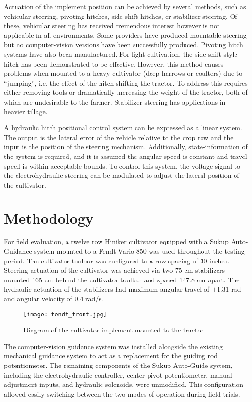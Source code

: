 Actuation of the implement position can be achieved by several
methods, such as vehicular steering, pivoting hitches, side-shift
hitches, or stabilizer steering. Of these, vehicular steering has
received tremendous interest however is not applicable in all
environments. Some providers have produced mountable steering but no
computer-vision versions have been successfully produced. Pivoting
hitch systems have also been manufactured. For light cultivation, the
side-shift style hitch has been demonstrated to be effective. However,
this method causes problems when mounted to a heavy cultivator (deep
harrows or coulters) due to “jumping”, i.e. the effect of the hitch
shifting the tractor. To address this requires either removing tools
or dramatically increasing the weight of the tractor, both of which
are undesirable to the farmer. Stabilizer steering has applications in
heavier tillage.

A hydraulic hitch positional control system can be expressed as a
linear system. The output is the lateral error of the vehicle relative
to the crop row and the input is the position of the steering
mechanism. Additionally, state-information of the system is required,
and it is assumed the angular speed is constant and travel speed is
within acceptable bounds. To control this system, the voltage signal
to the electrohydraulic steering can be modulated to adjust the
lateral position of the cultivator.

\section{Methodology}
For field evaluation, a twelve row Hiniker cultivator equipped with a
Sukup Auto-Guidance system mounted to a Fendt Vario 850 was used
throughout the testing period. The cultivator toolbar was configured
to a row-spacing of 30 inches. Steering actuation of the cultivator
was achieved via two 75 cm stabilizers mounted 165 cm behind the
cultivator toolbar and spaced 147.8 cm apart. The hydraulic actuation
of the stabilizers had maximum angular travel of $\pm$1.31 rad and angular
velocity of 0.4 rad/s.

\begin{figure}
  \centering
  \texttt{[image: fendt\_front.jpg]}
  \caption{Diagram of the cultivator implement mounted to the tractor.}
\end{figure}

The computer-vision guidance system was installed alongside the
existing mechanical guidance system to act as a replacement for the
guiding rod potentiometer. The remaining components of the Sukup
Auto-Guide system, including the electrohydraulic controller,
center-pivot potentiometer, manual adjustment inputs, and hydraulic
solenoids, were unmodified. This configuration allowed easily
switching between the two modes of operation during field trials.

